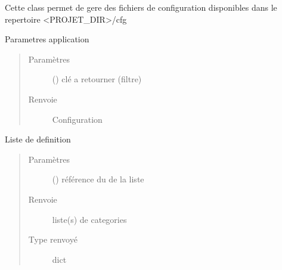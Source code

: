 \documentclass[letterpaper,10pt,french]{sphinxmanual}
\begin{document}
\begin{fulllineitems}
\label{\detokenize{classes/cfgloader:toolbox.cfgmng.CFGBases}}
Cette class permet de gere des fichiers de configuration disponibles dans le repertoire \textless{}PROJET\_DIR\textgreater{}/cfg

\begin{fulllineitems}
\label{\detokenize{classes/cfgloader:toolbox.cfgmng.CFGBases.app_cfg}}
Parametres application
\begin{quote}\begin{description}
\item[{Paramètres}] \leavevmode
{} () \textendash{} clé a retourner (filtre)

\item[{Renvoie}] \leavevmode
Configuration

\end{description}\end{quote}

\end{fulllineitems}


\begin{fulllineitems}
\label{\detokenize{classes/cfgloader:toolbox.cfgmng.CFGBases.categorie_lib}}
Liste de definition
\begin{quote}\begin{description}
\item[{Paramètres}] \leavevmode
{} () \textendash{} référence du de la liste

\item[{Renvoie}] \leavevmode
liste(s) de categories

\item[{Type renvoyé}] \leavevmode
dict


\end{description}
\end{quote}
\end{fulllineitems}
\end{fulllineitems}
\end{document}
